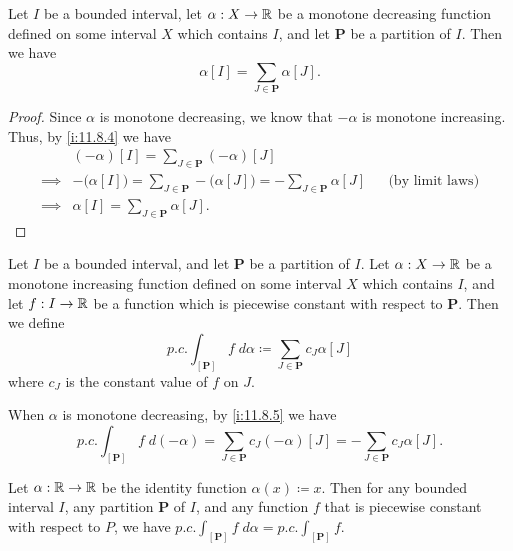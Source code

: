 \begin{ac}\label{i:ac:11.8.3}
  Let \(I\) be a bounded interval, let \(\alpha : X \to \mathbb{R}\) be a monotone decreasing function defined on some interval \(X\) which contains \(I\), and let \(\mathbf{P}\) be a partition of \(I\).
  Then we have
  \[
    \alpha[I] = \sum_{J \in \mathbf{P}} \alpha[J].
  \]
\end{ac}

\begin{proof}
  Since \(\alpha\) is monotone decreasing, we know that \(-\alpha\) is monotone increasing.
  Thus, by \cref{i:11.8.4} we have
  \begin{align*}
             & (-\alpha)[I] = \sum_{J \in \mathbf{P}} (-\alpha)[J]                                                                                  \\
    \implies & -\big(\alpha[I]\big) = \sum_{J \in \mathbf{P}} -\big(\alpha[J]\big) = -\sum_{J \in \mathbf{P}} \alpha[J] &  & \text{(by limit laws)} \\
    \implies & \alpha[I] = \sum_{J \in \mathbf{P}} \alpha[J].
  \end{align*}
\end{proof}

\begin{defn}\label{i:11.8.5}
  Let \(I\) be a bounded interval, and let \(\mathbf{P}\) be a partition of \(I\).
  Let \(\alpha : X \to \mathbb{R}\) be a monotone increasing function defined on some interval \(X\) which contains \(I\), and let \(f : I \to \mathbb{R}\) be a function which is piecewise constant with respect to \(\mathbf{P}\).
  Then we define
  \[
    p.c. \int_{[\mathbf{P}]} f \; d \alpha \coloneqq \sum_{J \in \mathbf{P}} c_J \alpha[J]
  \]
  where \(c_J\) is the constant value of \(f\) on \(J\).
\end{defn}

\begin{note}
  When \(\alpha\) is monotone decreasing, by \cref{i:11.8.5} we have
  \[
    p.c. \int_{[\mathbf{P}]} f \; d (-\alpha) = \sum_{J \in \mathbf{P}} c_J (-\alpha)[J] = - \sum_{J \in \mathbf{P}} c_J \alpha[J].
  \]
\end{note}

\setcounter{thm}{6}
\begin{eg}\label{i:11.8.7}
  Let \(\alpha : \mathbb{R} \to \mathbb{R}\) be the identity function \(\alpha(x) \coloneqq x\).
  Then for any bounded interval \(I\), any partition \(\mathbf{P}\) of \(I\), and any function \(f\) that is piecewise constant with respect to \(P\), we have \(p.c. \int_{[\mathbf{P}]} f \; d \alpha = p.c. \int_{[\mathbf{P}]} f\).
\end{eg}

